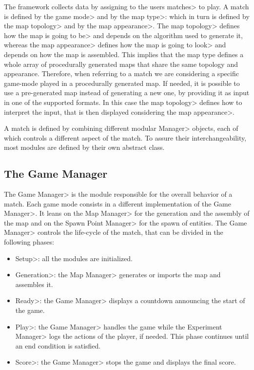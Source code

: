 The framework collects data by assigning to the users \<matches> to play. A match is defined by the \<game mode> and by the \<map type>: which in turn is defined by the \<map topology> and by the \<map appearance>. The \<map topology> defines how the map is going to \<be> and depends on the algorithm used to generate it, whereas the \<map appearance> defines how the map is going to \<look> and depends on how the map is assembled. This implies that the map type defines a whole array of procedurally generated maps that share the same topology and appearance. Therefore, when referring to a match we are considering a specific game-mode played in a procedurally generated map. If needed, it is possible to use a pre-generated map instead of generating a new one, by providing it as input in one of the supported formats. In this case the \<map topology> defines how to interpret the input, that is then displayed considering the \<map appearance>.

\par

A match is defined by combining different modular \<Manager> objects, each of which controls a different aspect of the match. To assure their interchangeability, most modules are defined by their own abstract class.


\subsection{The Game Manager}

The \<Game Manager> is the module responsible for the overall behavior of a match. Each game mode consists in a different implementation of the \<Game Manager>. It leans on the \<Map Manager> for the generation and the assembly of the map and on the \<Spawn Point Manager> for the spawn of entities. The \<Game Manager> controls the life-cycle of the match, that can be divided in the following phases:

\begin{itemize}
\item \<Setup>: all the modules are initialized.
\item \<Generation>: the \<Map Manager> generates or imports the map and assembles it.
\item \<Ready>: the \<Game Manager> displays a countdown announcing the start of the game.
\item \<Play>: the \<Game Manager> handles the game while the \<Experiment Manager> logs the actions of the player, if needed. This phase continues until an end condition is satisfied.
\item \<Score>: the \<Game Manager> stops the game and displays the final score.
\end{itemize}

